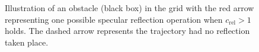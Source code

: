 \begin{figure}
    

    \caption{Illustration of an obstacle (black box) in the grid with the red arrow representing one possible specular reflection operation when $c_\text{rel} > 1$ holds. The dashed arrow represents the trajectory had no reflection taken place. }
    \label{fig:specular reflection c3}
\end{figure}

